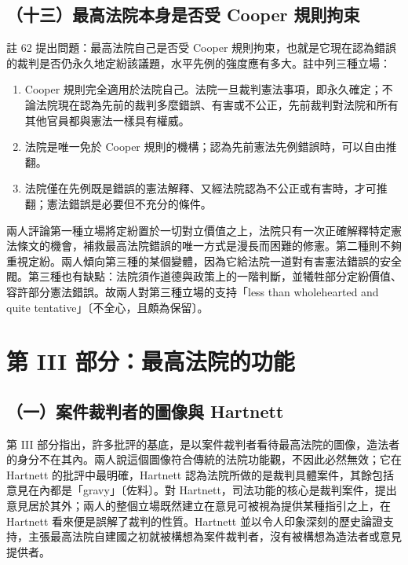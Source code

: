 \subsection{（十三）最高法院本身是否受 Cooper 規則拘束}

註 62 提出問題：最高法院自己是否受 Cooper 規則拘束，也就是它現在認為錯誤的裁判是否仍永久地定紛該議題，水平先例的強度應有多大。註中列三種立場：

\begin{enumerate}
\def\labelenumi{\arabic{enumi}.}
\tightlist
\item
  Cooper 規則完全適用於法院自己。法院一旦裁判憲法事項，即永久確定；不論法院現在認為先前的裁判多麼錯誤、有害或不公正，先前裁判對法院和所有其他官員都與憲法一樣具有權威。
\item
  法院是唯一免於 Cooper 規則的機構；認為先前憲法先例錯誤時，可以自由推翻。
\item
  法院僅在先例既是錯誤的憲法解釋、又經法院認為不公正或有害時，才可推翻；憲法錯誤是必要但不充分的條件。
\end{enumerate}

兩人評論第一種立場將定紛置於一切對立價值之上，法院只有一次正確解釋特定憲法條文的機會，補救最高法院錯誤的唯一方式是漫長而困難的修憲。第二種則不夠重視定紛。兩人傾向第三種的某個變體，因為它給法院一道對有害憲法錯誤的安全閥。第三種也有缺點：法院須作道德與政策上的一階判斷，並犧牲部分定紛價值、容許部分憲法錯誤。故兩人對第三種立場的支持「less than wholehearted and quite tentative」〔不全心，且頗為保留〕。

\section{第 III 部分：最高法院的功能}
\label{sec:AS-4}

\subsection{（一）案件裁判者的圖像與 Hartnett}

第 III 部分指出，許多批評的基底，是以案件裁判者看待最高法院的圖像，造法者的身分不在其內。兩人說這個圖像符合傳統的法院功能觀，不因此必然無效；它在 Hartnett 的批評中最明確，Hartnett 認為法院所做的是裁判具體案件，其餘包括意見在內都是「gravy」〔佐料〕。對 Hartnett，司法功能的核心是裁判案件，提出意見居於其外；兩人的整個立場既然建立在意見可被視為提供某種指引之上，在 Hartnett 看來便是誤解了裁判的性質。Hartnett 並以令人印象深刻的歷史論證支持，主張最高法院自建國之初就被構想為案件裁判者，沒有被構想為造法者或意見提供者。

